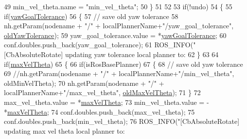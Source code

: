 \begin{DoxyCode}
49         min\_vel\_theta.name = \textcolor{stringliteral}{"min\_vel\_theta"};
50     \}
51     
52     
53     \textcolor{keywordflow}{if}(!undo)
54     \{
55        \textcolor{keywordflow}{if}(\hyperlink{classcl__move__base__z_1_1CbAbsoluteRotate_a8d8b5b9c2c821efe101bb07c96c4bdd3}{yawGoalTolerance})
56        \{
57             \textcolor{comment}{// save old yaw tolerance}
58             nh.getParam(nodename + \textcolor{stringliteral}{"/"}  + localPlannerName+\textcolor{stringliteral}{"/yaw\_goal\_tolerance"}, 
      \hyperlink{classcl__move__base__z_1_1CbAbsoluteRotate_a2cfcd2978e7923494e2e66107e134e27}{oldYawTolerance});
59             yaw\_goal\_tolerance.value = *\hyperlink{classcl__move__base__z_1_1CbAbsoluteRotate_a8d8b5b9c2c821efe101bb07c96c4bdd3}{yawGoalTolerance};
60             conf.doubles.push\_back(yaw\_goal\_tolerance);
61             ROS\_INFO(\textcolor{stringliteral}{"[CbAbsoluteRotate] updating yaw tolerance local planner to: %
62        \}
63 
64        \textcolor{keywordflow}{if}(\hyperlink{classcl__move__base__z_1_1CbAbsoluteRotate_ac0018b01a202dd805e3d3b50ed205d23}{maxVelTheta})
65        \{
66            \textcolor{keywordflow}{if}(isRosBasePlanner)
67            \{
68                 \textcolor{comment}{// save old yaw tolerance}
69                 \textcolor{comment}{//nh.getParam(nodename + "/"  + localPlannerName+"/min\_vel\_theta", oldMinVelTheta);}
70                 nh.getParam(nodename + \textcolor{stringliteral}{"/"}  + localPlannerName+\textcolor{stringliteral}{"/max\_vel\_theta"}, 
      \hyperlink{classcl__move__base__z_1_1CbAbsoluteRotate_a131095d57ad3fd423bb9eaebebf61cc9}{oldMaxVelTheta});
71            \}
72             max\_vel\_theta.value = *\hyperlink{classcl__move__base__z_1_1CbAbsoluteRotate_ac0018b01a202dd805e3d3b50ed205d23}{maxVelTheta};
73             min\_vel\_theta.value = -*\hyperlink{classcl__move__base__z_1_1CbAbsoluteRotate_ac0018b01a202dd805e3d3b50ed205d23}{maxVelTheta};
74             conf.doubles.push\_back(max\_vel\_theta);
75             conf.doubles.push\_back(min\_vel\_theta);
76             ROS\_INFO(\textcolor{stringliteral}{"[CbAbsoluteRotate] updating max vel theta local planner to: %
}}
\end{DoxyCode}
